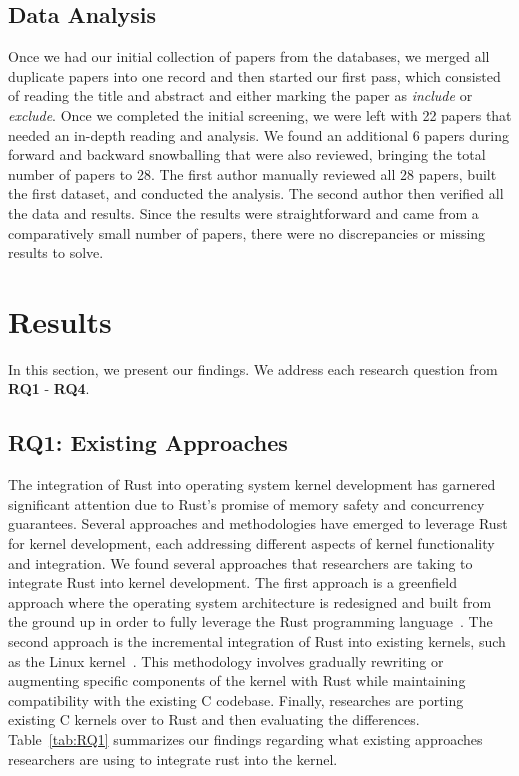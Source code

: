 \documentclass[sigconf]{acmart}
\begin{document}
\subsection{Data Analysis}

Once we had our initial collection of papers from the databases, we merged all duplicate papers into one record and then started our first pass, which consisted of reading the title and abstract and either marking the paper as \textit{include} or \textit{exclude}. Once we completed the initial screening, we were left with 22 papers that needed an in-depth reading and analysis. We found an additional 6 papers during forward and backward snowballing that were also reviewed, bringing the total number of papers to 28. The first author manually reviewed all 28 papers, built the first dataset, and conducted the analysis. The second author then verified all the data and results. Since the results were straightforward and came from a comparatively small number of papers, there were no discrepancies or missing results to solve. 

\section{Results}

In this section, we present our findings. We address each research question from \textbf{RQ1} - \textbf{RQ4}.

\subsection{RQ1: Existing Approaches}



The integration of Rust into operating system kernel development has garnered significant attention
due to Rust's promise of memory safety and concurrency guarantees. Several approaches and
methodologies have emerged to leverage Rust for kernel development, each addressing different
aspects of kernel functionality and integration.  We found several approaches that researchers are
taking to integrate Rust into kernel development. The first approach is a greenfield approach
where the operating system architecture is redesigned and built from the ground up in order to fully
leverage the Rust programming language~\cite{Culic2022-bk, Boos2020-zh}. The second approach is the incremental integration of Rust
into existing kernels, such as the Linux
kernel~\cite{The_kernel_development_community_undated-iw, Miller2021-pg, Oikawa2023-ms}. This methodology involves gradually
rewriting or augmenting specific components of the kernel with Rust while maintaining compatibility
with the existing C codebase. Finally, researches are porting existing C kernels over to Rust and then evaluating the differences. Table~\ref{tab:RQ1} summarizes our findings regarding what existing
approaches researchers are using to integrate rust into the kernel.
\end{document}
